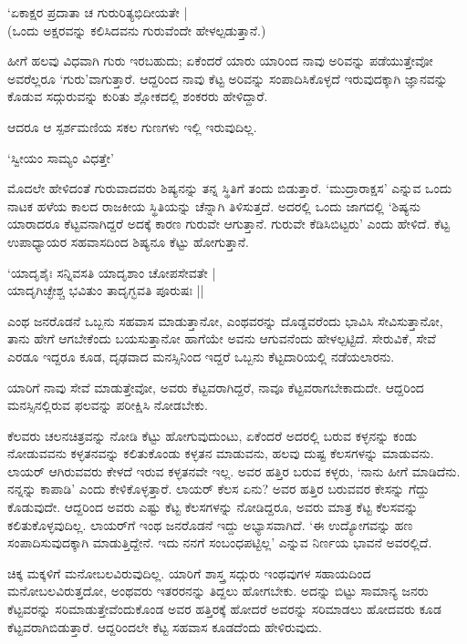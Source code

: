 \begin{shloka}
`ಏಕಾಕ್ಷರ ಪ್ರದಾತಾ ಚ ಗುರುರಿತ್ಯಭಿದೀಯತೇ |\\
(ಒಂದು ಅಕ್ಷರವನ್ನು ಕಲಿಸಿದವನು ಗುರುವೆಂದೇ ಹೇಳಲ್ಪಡುತ್ತಾನೆ.)
\end{shloka} 

ಹೀಗೆ ಹಲವು ವಿಧವಾಗಿ ಗುರು ಇರಬಹುದು; ಏಕೆಂದರೆ ಯಾರು ಯಾರಿಂದ ನಾವು ಅರಿವನ್ನು ಪಡೆಯುತ್ತೇವೋ ಅವರೆಲ್ಲರೂ `ಗುರು'ವಾಗುತ್ತಾರೆ. ಆದ್ದರಿಂದ ನಾವು ಕೆಟ್ಟ ಅರಿವನ್ನು ಸಂಪಾದಿಸಿಕೊಳ್ಳದೆ ಇರುವುದಕ್ಕಾಗಿ ಜ್ಞಾನವನ್ನು ಕೊಡುವ ಸದ್ಗುರುವನ್ನು ಕುರಿತು ಶ್ಲೋಕದಲ್ಲಿ ಶಂಕರರು ಹೇಳಿದ್ದಾರೆ.

ಆದರೂ ಆ ಸ್ಪರ್ಶಮಣಿಯ ಸಕಲ ಗುಣಗಳು ಇಲ್ಲಿ ಇರುವುದಿಲ್ಲ. 


\begin{shloka}
`ಸ್ವೀಯಂ ಸಾಮ್ಯಂ ವಿಧತ್ತೇ'
\end{shloka}

ಮೊದಲೇ ಹೇಳಿದಂತೆ ಗುರುವಾದವರು ಶಿಷ್ಯನನ್ನು ತನ್ನ ಸ್ಥಿತಿಗೆ ತಂದು ಬಿಡುತ್ತಾರೆ. `ಮುದ್ರಾರಾಕ್ಷಸ' ಎನ್ನುವ ಒಂದು ನಾಟಕ ಹಳೆಯ ಕಾಲದ ರಾಜಕೀಯ ಸ್ಥಿತಿಯನ್ನು ಚೆನ್ನಾಗಿ ತಿಳಿಸುತ್ತದೆ. ಅದರಲ್ಲಿ ಒಂದು ಜಾಗದಲ್ಲಿ `ಶಿಷ್ಯನು ಯಾರಾದರೂ ಕೆಟ್ಟವನಾಗಿದ್ದರೆ ಅದಕ್ಕೆ ಕಾರಣ ಗುರುವೇ ಆಗುತ್ತಾನೆ. ಗುರುವೇ ಕೆಡಿಸಿಬಿಟ್ಟರು' ಎಂದು ಹೇಳಿದೆ. ಕೆಟ್ಟ ಉಪಾಧ್ಯಾಯರ ಸಹವಾಸದಿಂದ ಶಿಷ್ಯನೂ ಕೆಟ್ಟು ಹೋಗುತ್ತಾನೆ.

\begin{shloka}
`ಯಾದೃಶೈಃ ಸನ್ನಿವಸತಿ ಯಾದೃಶಾಂ ಚೋಪಸೇವತೇ |\\
ಯಾದೃಗಿಚ್ಛೇಶ್ಚ ಭವಿತುಂ ತಾದೃಗ್ಭವತಿ ಪೂರುಷಃ ||
\end{shloka}

 ಎಂಥ ಜನರೊಡನೆ ಒಬ್ಬನು ಸಹವಾಸ ಮಾಡುತ್ತಾನೋ, ಎಂಥವರನ್ನು ದೊಡ್ಡವರೆಂದು ಭಾವಿಸಿ ಸೇವಿಸುತ್ತಾನೋ, ತಾನು ಹೇಗೆ ಆಗಬೇಕೆಂದು ಬಯಸುತ್ತಾನೋ ಹಾಗೆಯೇ ಅವನು ಆಗುವನೆಂದು ಹೇಳಲ್ಪಟ್ಟಿದೆ. ಸೇರುವಿಕೆ, ಸೇವೆ ಎರಡೂ ಇದ್ದರೂ ಕೂಡ, ದೃಢವಾದ ಮನಸ್ಸಿನಿಂದ ಇದ್ದರೆ ಒಬ್ಬನು ಕೆಟ್ಟದಾರಿಯಲ್ಲಿ ನಡೆಯಲಾರನು. 
 
 ಯಾರಿಗೆ ನಾವು ಸೇವೆ ಮಾಡುತ್ತೇವೋ, ಅವರು ಕೆಟ್ಟವರಾಗಿದ್ದರೆ, ನಾವೂ ಕೆಟ್ಟವರಾಗಬೇಕಾದುದೇ. ಆದ್ದರಿಂದ ಮನಸ್ಸಿನಲ್ಲಿರುವ ಫಲವನ್ನು ಪರೀಕ್ಷಿಸಿ ನೋಡಬೇಕು.
 
ಕೆಲವರು ಚಲನಚಿತ್ರವನ್ನು ನೋಡಿ ಕೆಟ್ಟು ಹೋಗುವುದುಂಟು, ಏಕೆಂದರೆ ಅದರಲ್ಲಿ ಬರುವ ಕಳ್ಳನನ್ನು ಕಂಡು ನೋಡುವವನು ಕಳ್ಳತನವನ್ನು ಕಲಿತುಕೊಂಡು ಕಳ್ಳತನ ಮಾಡುವನು, ಹಲವು ದುಷ್ಟ ಕೆಲಸಗಳನ್ನು ಮಾಡುವನು. ಲಾಯರ್ ಆಗಿರುವವರು ಕೇಳದೆ ಇರುವ ಕಳ್ಳತನವೇ ಇಲ್ಲ. ಅವರ ಹತ್ತಿರ ಬರುವ ಕಳ್ಳರು, `ನಾನು ಹೀಗೆ ಮಾಡಿದೆನು. ನನ್ನನ್ನು ಕಾಪಾಡಿ' ಎಂದು ಕೇಳಿಕೊಳ್ಳತ್ತಾರೆ. ಲಾಯರ್ ಕೆಲಸ ಏನು? ಅವರ ಹತ್ತಿರ ಬರುವವರ ಕೇಸನ್ನು ಗೆದ್ದು ಕೊಡುವುದೇ. ಆದ್ದರಿಂದ ಅವರು ಎಷ್ಟು ಕೆಟ್ಟ ಕೆಲಸಗಳನ್ನು ನೋಡಿದ್ದರೂ, ಅವರು ಮಾತ್ರ ಕೆಟ್ಟ ಕೆಲಸವನ್ನು ಕಲಿತುಕೊಳ್ಳವುದಿಲ್ಲ. ಲಾಯರ್‌ಗೆ ಇಂಥ ಜನರೊಡನೆ ಇದ್ದು ಅಭ್ಯಾಸವಾಗಿದೆ. `ಈ ಉದ್ಯೋಗವನ್ನು ಹಣ ಸಂಪಾದಿಸುವುದಕ್ಕಾಗಿ ಮಾಡುತ್ತಿದ್ದೇನೆ. ಇದು ನನಗೆ ಸಂಬಂಧಪಟ್ಟಿಲ್ಲ' ಎನ್ನುವ ನಿರ್ಣಯ ಭಾವನೆ ಅವರಲ್ಲಿದೆ. 

ಚಿಕ್ಕ ಮಕ್ಕಳಿಗೆ ಮನೋಬಲವಿರುವುದಿಲ್ಲ. ಯಾರಿಗೆ ಶಾಸ್ತ್ರ ಸದ್ಗುರು ಇಂಥವುಗಳ ಸಹಾಯದಿಂದ ಮನೋಬಲವಿರುತ್ತದೋ, ಅಂಥವರು ಇತರರನನ್ನು ತಿದ್ದಲು ಹೋಗಬೇಕು. ಅದನ್ನು ಬಿಟ್ಟು ಸಾಮಾನ್ಯ ಜನರು ಕೆಟ್ಟವರನ್ನು ಸರಿಮಾಡುತ್ತೇವೆಂದುಕೊಂಡ ಅವರ ಹತ್ತಿರಕ್ಕೆ ಹೋದರೆ ಅವರನ್ನು ಸರಿಮಾಡಲು ಹೋದವರು ಕೂಡ ಕೆಟ್ಟವರಾಗಿಬಿಡುತ್ತಾರೆ. ಆದ್ದರಿಂದಲೇ ಕೆಟ್ಟ ಸಹವಾಸ  ಕೂಡದೆಂದು ಹೇಳಿರುವುದು.

